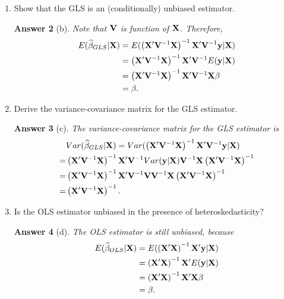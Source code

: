 \documentclass[12pt,a4paper]{article}
\newtheorem{ans}{Answer}
\begin{document}
\begin{enumerate}
\begin{enumerate}
\begin{ans}[a]
\begin{align*}
\end{align*}
${\bf X}$ is a full column rank matrix and ${\bf V}^{-1}$ is a positive definite matrix; therefore, ${\bf X}'{\bf V}^{-1}{\bf X}$ is a positive definite matrix and invertible. Thus, we have
\begin{align*}
\widehat{\beta}_{GLS}=\left({\bf X}'{\bf V}^{-1}{\bf X} \right)^{-1}{\bf X}'{\bf V}^{-1}{\bf y}.
\end{align*}
\end{ans}
\item{Show that the GLS is an (conditionally) unbiased estimator.}
\setcounter{ans}{1}
\begin{ans}[b]
Note that ${\bf V}$ is function of ${\bf X}$. Therefore,
\begin{align*}
E(\widehat{\beta}_{GLS}|{\bf X})&=E(\left({\bf X}'{\bf V}^{-1}{\bf X} \right)^{-1}{\bf X}'{\bf V}^{-1}{\bf y}|{\bf X})\\
&=\left({\bf X}'{\bf V}^{-1}{\bf X} \right)^{-1}{\bf X}'{\bf V}^{-1}E({\bf y}|{\bf X})\\
&=\left({\bf X}'{\bf V}^{-1}{\bf X} \right)^{-1}{\bf X}'{\bf V}^{-1}{\bf X}\beta\\
&=\beta.
\end{align*}
\end{ans}

\item{Derive the variance-covariance matrix for the GLS estimator.}
\setcounter{ans}{1}
\begin{ans}[c]
The variance-covariance matrix for the GLS estimator is
\begin{align*}
&Var(\widehat{\beta}_{GLS}|{\bf X})=Var(\left({\bf X}'{\bf V}^{-1}{\bf X} \right)^{-1}{\bf X}'{\bf V}^{-1}{\bf y}|{\bf X})\\
=&\left({\bf X}'{\bf V}^{-1}{\bf X} \right)^{-1}{\bf X}'{\bf V}^{-1}Var({\bf y}|{\bf X}){\bf V}^{-1}{\bf X} \left({\bf X}'{\bf V}^{-1}{\bf X} \right)^{-1}\\
=&\left({\bf X}'{\bf V}^{-1}{\bf X} \right)^{-1}{\bf X}'{\bf V}^{-1}{\bf V}{\bf V}^{-1}{\bf X} \left({\bf X}'{\bf V}^{-1}{\bf X} \right)^{-1}\\
=&\left({\bf X}'{\bf V}^{-1}{\bf X} \right)^{-1}.
\end{align*}
\end{ans}
\item{Is the OLS estimator unbiased in the presence of heteroskedasticity?}
\setcounter{ans}{1}
\begin{ans}[d]
The OLS estimator is still unbiased, because
\begin{align*}
E(\widehat{\beta}_{OLS}|{\bf X})&=E(\left({\bf X}'{\bf X} \right)^{-1}{\bf X}'{\bf y}|{\bf X})\\
&=\left({\bf X}'{\bf X} \right)^{-1}{\bf X}'E({\bf y}|{\bf X})\\
&=\left({\bf X}'{\bf X} \right)^{-1}{\bf X}'{\bf X}\beta\\
&=\beta.
\end{align*}
\end{ans}
\end{enumerate}
\vspace*{0.5cm}
\end{enumerate}
\end{document}
